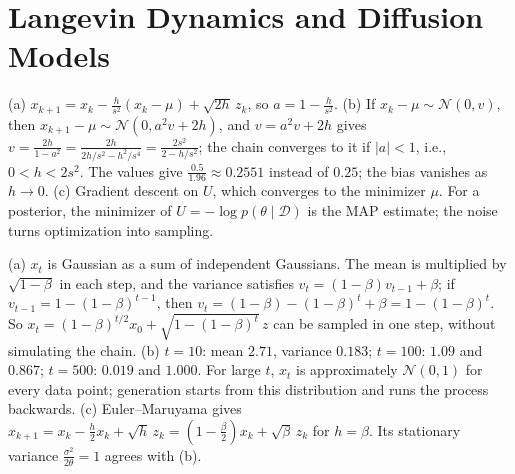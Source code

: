 \documentclass[11pt]{article}
\begin{document}
\section*{Langevin Dynamics and Diffusion Models}

\begin{description}[leftmargin=0pt, itemsep=0.3em]
    \item[\ref{pr:ula}.] (a) $x_{k+1} = x_k - \frac{h}{s^2}(x_k - \mu) + \sqrt{2h}\,z_k$, so $a = 1 - \frac{h}{s^2}$. (b) If $x_k - \mu \sim \mathcal{N}(0, v)$, then $x_{k+1} - \mu \sim \mathcal{N}(0, a^2v + 2h)$, and $v = a^2v + 2h$ gives $v = \frac{2h}{1 - a^2} = \frac{2h}{2h/s^2 - h^2/s^4} = \frac{2s^2}{2 - h/s^2}$; the chain converges to it if $|a| < 1$, i.e., $0 < h < 2s^2$. The values give $\frac{0.5}{1.96} \approx 0.2551$ instead of $0.25$; the bias vanishes as $h \to 0$. (c) Gradient descent on $U$, which converges to the minimizer $\mu$. For a posterior, the minimizer of $U = -\log p(\theta \mid \mathcal{D})$ is the MAP estimate; the noise turns optimization into sampling.
    \item[\ref{pr:diffusion-forward}.] (a) $x_t$ is Gaussian as a sum of independent Gaussians. The mean is multiplied by $\sqrt{1 - \beta}$ in each step, and the variance satisfies $v_t = (1 - \beta)v_{t-1} + \beta$; if $v_{t-1} = 1 - (1 - \beta)^{t-1}$, then $v_t = (1 - \beta) - (1 - \beta)^t + \beta = 1 - (1 - \beta)^t$. So $x_t = (1 - \beta)^{t/2}x_0 + \sqrt{1 - (1 - \beta)^t}\,z$ can be sampled in one step, without simulating the chain. (b) $t = 10$: mean $2.71$, variance $0.183$; $t = 100$: $1.09$ and $0.867$; $t = 500$: $0.019$ and $1.000$. For large $t$, $x_t$ is approximately $\mathcal{N}(0, 1)$ for every data point; generation starts from this distribution and runs the process backwards. (c) Euler--Maruyama gives $x_{k+1} = x_k - \frac{h}{2}x_k + \sqrt{h}\,z_k = (1 - \frac{\beta}{2})x_k + \sqrt{\beta}\,z_k$ for $h = \beta$. Its stationary variance $\frac{\sigma^2}{2\theta} = 1$ agrees with (b).
\end{description}
\end{document}
